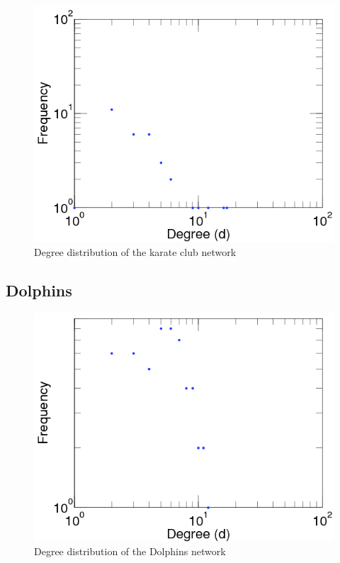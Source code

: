 \begin{figure}[!htb]
	\begin{center}
		\includegraphics[scale=.4]{images/zachary_degree_dist.png}
	\end{center}
	\caption{Degree distribution of the karate club network\cite{Kunegis2013}}
	\label{logo}
\end{figure}

\subsection{Dolphins}
\cite{Lusseau2003}
\begin{figure}[!htb]
	\begin{center}
		\includegraphics[scale=.4]{images/dolphins_degree_dist.png}
	\end{center}
	\caption{Degree distribution of the Dolphins network\cite{Kunegis2013}}
	\label{logo}
\end{figure}


